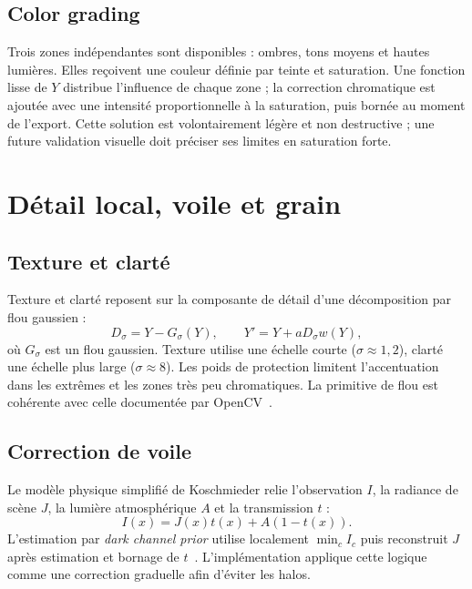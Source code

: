 \subsection{Color grading}

Trois zones indépendantes sont disponibles : ombres, tons moyens et hautes lumières. Elles reçoivent une couleur définie par teinte et saturation. Une fonction lisse de $Y$ distribue l'influence de chaque zone ; la correction chromatique est ajoutée avec une intensité proportionnelle à la saturation, puis bornée au moment de l'export. Cette solution est volontairement légère et non destructive ; une future validation visuelle doit préciser ses limites en saturation forte.

\section{Détail local, voile et grain}

\subsection{Texture et clarté}

Texture et clarté reposent sur la composante de détail d'une décomposition par flou gaussien :
\begin{equation}
  D_\sigma = Y-G_\sigma(Y), \qquad Y'=Y+aD_\sigma w(Y),
\end{equation}
où $G_\sigma$ est un flou gaussien. Texture utilise une échelle courte ($\sigma\approx1{,}2$), clarté une échelle plus large ($\sigma\approx8$). Les poids de protection limitent l'accentuation dans les extrêmes et les zones très peu chromatiques. La primitive de flou est cohérente avec celle documentée par OpenCV~\cite{opencvGaussian}.

\subsection{Correction de voile}

Le modèle physique simplifié de Koschmieder relie l'observation $I$, la radiance de scène $J$, la lumière atmosphérique $A$ et la transmission $t$ :
\begin{equation}
  I(x)=J(x)t(x)+A(1-t(x)).
\end{equation}
L'estimation par \emph{dark channel prior} utilise localement $\min_c I_c$ puis reconstruit $J$ après estimation et bornage de $t$~\cite{he2009,he2011}. L'implémentation applique cette logique comme une correction graduelle afin d'éviter les halos.

